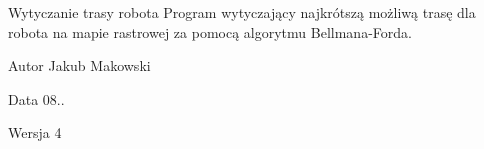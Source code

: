 \begin{DoxyParagraph}{Wytyczanie trasy robota}
Program wytyczający najkrótszą możliwą trasę dla robota na mapie rastrowej za pomocą algorytmu Bellmana-\/\+Forda. 
\end{DoxyParagraph}
\begin{DoxyAuthor}{Autor}
Jakub Makowski 
\end{DoxyAuthor}
\begin{DoxyDate}{Data}
08.. 
\end{DoxyDate}
\begin{DoxyVersion}{Wersja}
4 
\end{DoxyVersion}
